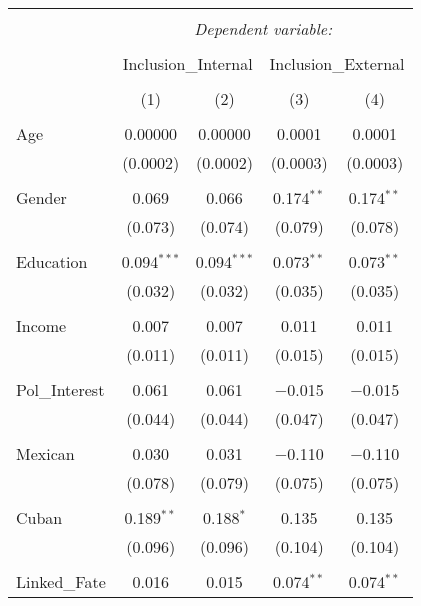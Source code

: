
\begin{table}[!htbp] \centering 
  \caption{} 
  \label{} 
\begin{tabular}{@{\extracolsep{5pt}}lcccc} 
\\[-1.8ex]\hline 
\hline \\[-1.8ex] 
 & \multicolumn{4}{c}{\textit{Dependent variable:}} \\ 
\cline{2-5} 
\\[-1.8ex] & \multicolumn{2}{c}{Inclusion\_Internal} & \multicolumn{2}{c}{Inclusion\_External} \\ 
\\[-1.8ex] & (1) & (2) & (3) & (4)\\ 
\hline \\[-1.8ex] 
 Age & 0.00000 & 0.00000 & 0.0001 & 0.0001 \\ 
  & (0.0002) & (0.0002) & (0.0003) & (0.0003) \\ 
  & & & & \\ 
 Gender & 0.069 & 0.066 & 0.174$^{**}$ & 0.174$^{**}$ \\ 
  & (0.073) & (0.074) & (0.079) & (0.078) \\ 
  & & & & \\ 
 Education & 0.094$^{***}$ & 0.094$^{***}$ & 0.073$^{**}$ & 0.073$^{**}$ \\ 
  & (0.032) & (0.032) & (0.035) & (0.035) \\ 
  & & & & \\ 
 Income & 0.007 & 0.007 & 0.011 & 0.011 \\ 
  & (0.011) & (0.011) & (0.015) & (0.015) \\ 
  & & & & \\ 
 Pol\_Interest & 0.061 & 0.061 & $-$0.015 & $-$0.015 \\ 
  & (0.044) & (0.044) & (0.047) & (0.047) \\ 
  & & & & \\ 
 Mexican & 0.030 & 0.031 & $-$0.110 & $-$0.110 \\ 
  & (0.078) & (0.079) & (0.075) & (0.075) \\ 
  & & & & \\ 
 Cuban & 0.189$^{**}$ & 0.188$^{*}$ & 0.135 & 0.135 \\ 
  & (0.096) & (0.096) & (0.104) & (0.104) \\ 
  & & & & \\ 
 Linked\_Fate & 0.016 & 0.015 & 0.074$^{**}$ & 0.074$^{**}$ \\ 

\end{tabular}
\end{table}
